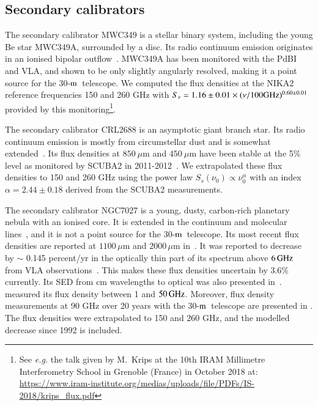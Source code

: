 \documentclass[traditionalabstract]{aa}
\newcommand{\trentemetre}{30-$\rm{m}$}
\newcommand{\lp}[1]{#1}
\begin{document}
{\begin{appendix}
\subsection{Secondary calibrators}
\label{se:ref_flux_secondaries}


The secondary calibrator MWC349 is a stellar
binary system, including the young Be star MWC349A, surrounded by a
disc. Its radio continuum emission
originates in an ionised bipolar outflow~\citep{Tafoya2004}. MWC349A has
been monitored with the PdBI and VLA, and
shown to be %
only slightly angularly resolved,
making it a point source for the \trentemetre\ telescope.
We computed the flux densities at the NIKA2 reference frequencies 150 and
260 GHz with $S_\nu = 1.16\pm0.01 \times
(\nu/100 \rm{GHz})^{0.60\pm0.01}$ provided by this
monitoring\footnote{See \emph{e.g.} the talk given by M.~Krips at the 10th 
IRAM Millimetre Interferometry School in Grenoble (France) in October
2018 at: 
\url{https://www.iram-institute.org/medias/uploads/file/PDFs/IS-2018/krips_flux.pdf}}.


The secondary calibrator CRL2688 is an asymptotic giant branch
star. Its radio continuum emission is mostly from circumstellar dust
and is somewhat extended~\citep{Knapp1994}.  Its flux densities at
$850\ \mu$m and $450 \ \mu$m have been stable at the 5\% level as
monitored by SCUBA2 in 2011-2012~\citep{Dempsey2013_SCUBA2}.
We extrapolated these flux densities to 150 and 260 GHz
using the power law $S_s(\nu_0) \propto \nu_0^{\alpha}$ with an index
$\alpha=2.44\pm0.18$ derived from the SCUBA2 measurements.


The secondary calibrator NGC7027 is a young, dusty, carbon-rich
planetary nebula with an ionised core.  It is extended in the
continuum and molecular lines~\citep{Bieging1991}, and it is not a point
source for the \trentemetre\ telescope.  Its most recent flux densities are
reported at $1100\, \mu$m and $2000\, \mu$m in~\citet{Hoare1992}. It was reported to decrease by $\sim$ 0.145 percent/yr in the optically
thin part of its spectrum above $6\,\rm{GHz}$ from VLA
observations~\citep{Zijlstra2008, Hafez2008}. This makes
these flux densities uncertain by 3.6\% currently. Its SED from cm
wavelengths to optical was also presented in~\citet{Hafez2008}. {\lp
\citet{Perley2013} measured its flux density between 1 and $50\,
\rm{GHz}$. Moreover, flux density measurements at 90 GHz over 20 years
with the \trentemetre\ telescope are presented in \citet{Kramer2008}.}
The flux densities were extrapolated to 150 and 260 GHz, and the
modelled decrease since 1992 is included.


\end{appendix}}
\end{document}
